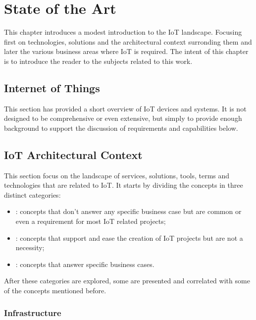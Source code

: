 \chapter{State of the Art}
\label{chap:stateofart}

This chapter introduces a modest introduction to the \gls{IoT} landscape. Focusing first on technologies, solutions and the architectural context surronding them and later the various business areas where \gls{IoT} is required.
The intent of this chapter is to introduce the reader to the subjects related to this work.

\section{Internet of Things}
\label{sec:stateofart:iot}

This section has provided a short overview of IoT devices and systems. It is not designed to be comprehensive or even extensive, but simply to provide enough background to support the discussion of requirements and capabilities below.

\section{IoT Architectural Context}
\label{sec:stateofart:arch}

This section focus on the landscape of services, solutions, tools, terms and technologies that are related to \gls{IoT}.
It starts by dividing the concepts in three distinct categories:

\begin{itemize}
    \item {}: concepts that don't answer any specific business case but are common or even a requirement for most \gls{IoT} related projects; 
    \item {}: concepts that support and ease the creation of \gls{IoT} projects but are not a necessity;
    \item {}: concepts that answer specific business cases.
\end{itemize}

After these categories are explored, some  are presented and correlated with some of the concepts mentioned before.

\subsection{Infrastructure} %
\label{subsec:stateofart:arch:infra}

